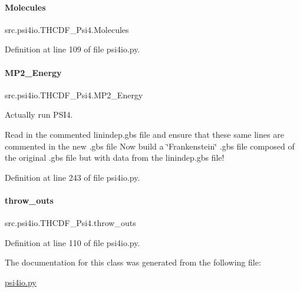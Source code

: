 \paragraph{\texorpdfstring{Molecules}{Molecules}}
{\footnotesize\ttfamily src.\+psi4io.\+T\+H\+C\+D\+F\+\_\+\+Psi4.\+Molecules}



Definition at line 109 of file psi4io.\+py.

\mbox{\label{classsrc_1_1psi4io_1_1THCDF__Psi4_af2a60fba0aa2ed33acb19569b1e2c32e}} 
\paragraph{\texorpdfstring{M\+P2\+\_\+\+Energy}{MP2\_Energy}}
{\footnotesize\ttfamily src.\+psi4io.\+T\+H\+C\+D\+F\+\_\+\+Psi4.\+M\+P2\+\_\+\+Energy}



Actually run P\+S\+I4. 

Read in the commented linindep.\+gbs file and ensure that these same lines are commented in the new .gbs file Now build a \char`\"{}\+Frankenstein\char`\"{} .gbs file composed of the original .gbs file but with data from the linindep.\+gbs file! 

Definition at line 243 of file psi4io.\+py.

\mbox{\label{classsrc_1_1psi4io_1_1THCDF__Psi4_ac96b467db68c670a676f358a3d638803}} 
\paragraph{\texorpdfstring{throw\+\_\+outs}{throw\_outs}}
{\footnotesize\ttfamily src.\+psi4io.\+T\+H\+C\+D\+F\+\_\+\+Psi4.\+throw\+\_\+outs}



Definition at line 110 of file psi4io.\+py.



The documentation for this class was generated from the following file\+:\begin{DoxyCompactItemize}
\item 
\hyperlink{psi4io_8py}{psi4io.\+py}\end{DoxyCompactItemize}
